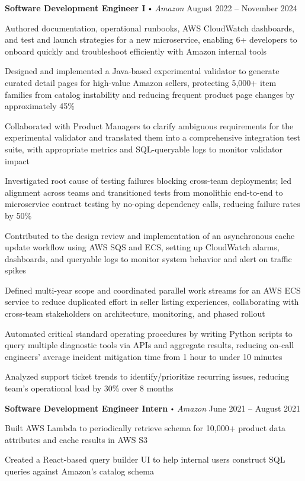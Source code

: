 \documentclass{article}
\newcommand{\employer}[4]{
\textbf{#1} \labelitemi \textit{#2} \hfill #3 \\ #4 \vspace*{3pt}
}
\renewcommand{\labelitemi}{
$\vcenter{\hbox{\tiny$\bullet$}}$\hspace*{3pt}
}
\renewcommand{\labelitemii}{
$\vcenter{\hbox{\tiny$\bullet$}}$\hspace*{-3pt}
}
\newenvironment{bullet-list-minor}{
\begin{list}{\labelitemii}{\setlength\leftmargin{15pt} 
\topsep 0pt \itemsep 1pt}}{\vspace*{4pt}\end{list}
}
\begin{document}
    \employer{Software Development Engineer I}{Amazon}{August 2022 -- November 2024}{}
    \smallskip
	\begin{bullet-list-minor}
        \item Authored  documentation, operational runbooks, AWS CloudWatch dashboards, and test and launch strategies for a new microservice, enabling 6+ developers to onboard quickly and troubleshoot efficiently with Amazon internal tools
        \item Designed and implemented a Java-based experimental validator to generate curated detail pages for high-value Amazon sellers, protecting 5,000+ item families from catalog instability and reducing frequent product page changes by approximately 45\%
        \item Collaborated with Product Managers to clarify ambiguous requirements for the experimental validator and translated them into a comprehensive integration test suite, with appropriate metrics and SQL-queryable logs to monitor validator impact
        \item Investigated root cause of testing failures blocking cross-team deployments; led alignment across teams and transitioned tests from monolithic end-to-end to microservice contract testing by no-oping dependency calls, reducing failure rates by 50\%
        \item Contributed to the design review and implementation of an asynchronous cache update workflow using AWS SQS and ECS, setting up CloudWatch alarms, dashboards, and queryable logs to monitor system behavior and alert on traffic spikes
        \item Defined multi-year scope and coordinated parallel work streams for an AWS ECS service to reduce duplicated effort in seller listing experiences, collaborating with cross-team stakeholders on architecture, monitoring, and phased rollout
        \item Automated critical standard operating procedures by writing Python scripts to query multiple diagnostic tools via APIs and aggregate results, reducing on-call engineers’ average incident mitigation time from 1 hour to under 10 minutes
        \item Analyzed support ticket trends to identify/prioritize recurring issues, reducing team’s operational load by 30\% over 8 months
    \end{bullet-list-minor}
    \medskip
    \smallskip
    
     \employer{Software Development Engineer Intern}{Amazon}{June  2021 -- August 2021}{}
    \smallskip
	\begin{bullet-list-minor}
	\item Built AWS Lambda to periodically retrieve schema for 10,000+ product data attributes and cache results in AWS S3
    \item Created a React-based query builder UI to help internal users construct SQL queries against Amazon’s catalog schema
    \end{bullet-list-minor}
    \bigskip
   
\end{document}
